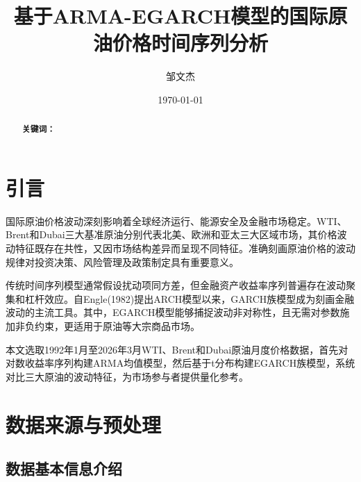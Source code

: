 \documentclass[12pt,a4paper]{ctexart}
\begin{document}
\title{\heiti 基于ARMA-EGARCH模型的国际原油价格时间序列分析}
\author{邹文杰}
\date{\today}
\maketitle

\begin{abstract}

\noindent\textbf{关键词：}
\end{abstract}

\newpage
\tableofcontents%

\newpage
\section{引言}

国际原油价格波动深刻影响着全球经济运行、能源安全及金融市场稳定。WTI、Brent和Dubai三大基准原油分别代表北美、欧洲和亚太三大区域市场，其价格波动特征既存在共性，又因市场结构差异而呈现不同特征。准确刻画原油价格的波动规律对投资决策、风险管理及政策制定具有重要意义。

传统时间序列模型通常假设扰动项同方差，但金融资产收益率序列普遍存在波动聚集和杠杆效应。自Engle(1982)提出ARCH模型以来，GARCH族模型成为刻画金融波动的主流工具。其中，EGARCH模型能够捕捉波动非对称性，且无需对参数施加非负约束，更适用于原油等大宗商品市场。

本文选取1992年1月至2026年3月WTI、Brent和Dubai原油月度价格数据，首先对对数收益率序列构建ARMA均值模型，然后基于t分布构建EGARCH族模型，系统对比三大原油的波动特征，为市场参与者提供量化参考。

\section{数据来源与预处理}
\subsection{数据基本信息介绍}
\end{document}
